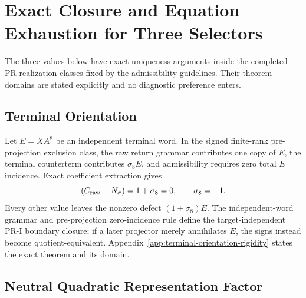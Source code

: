 \section{Exact Closure and Equation Exhaustion for Three Selectors}
\label{app:three-selector-closure}

The three values below have exact uniqueness arguments inside the completed PR realization classes fixed by the admissibility guidelines.  Their theorem domains are stated explicitly and no diagnostic preference enters.

\subsection{Terminal Orientation}

Let $E=XA^8$ be an independent terminal word.  In the signed finite-rank pre-projection exclusion class, the raw return grammar contributes one copy of $E$, the terminal counterterm contributes $\sigma_8E$, and admissibility requires zero total $E$ incidence.  Exact coefficient extraction gives
\begin{equation}
 [E](C_{\rm raw}+N_{\sigma})=1+\sigma_8=0,
 \qquad \sigma_8=-1.
\end{equation}
Every other value leaves the nonzero defect $(1+\sigma_8)E$.  The independent-word grammar and pre-projection zero-incidence rule define the target-independent PR-I boundary closure; if a later projector merely annihilates $E$, the signs instead become quotient-equivalent. Appendix~\ref{app:terminal-orientation-rigidity} states the exact theorem and its domain.

\subsection{Neutral Quadratic Representation Factor}


